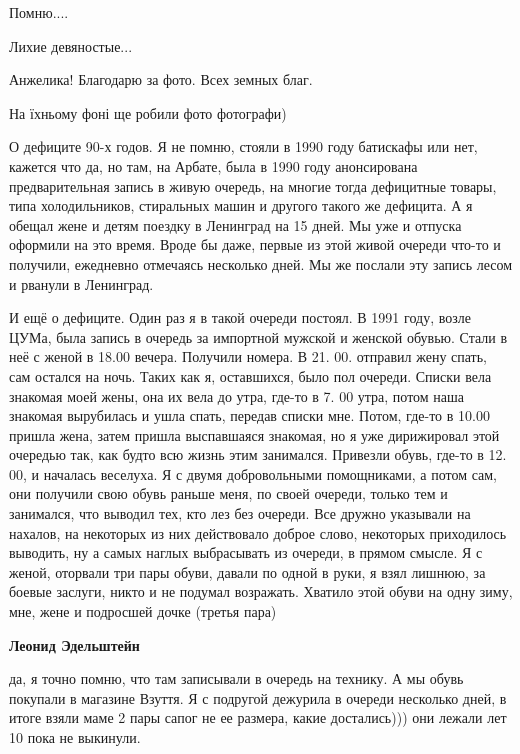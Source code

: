 Помню....


Лихие девяностые...


Анжелика! Благодарю за фото. Всех земных благ.


На їхньому фоні ще робили фото фотографи)


О дефиците 90-х годов. Я не помню, стояли в 1990 году батискафы или нет,
кажется что да, но там, на Арбате, была в 1990 году анонсирована
предварительная запись в живую очередь, на многие тогда дефицитные товары, типа
холодильников, стиральных машин и другого такого же дефицита. А я обещал жене и
детям поездку в Ленинград на 15 дней. Мы уже и отпуска оформили на это время.
Вроде бы даже, первые из этой живой очереди что-то и получили, ежедневно
отмечаясь несколько дней. Мы же послали эту запись лесом и рванули в Ленинград.

И ещё о дефиците. Один раз я в такой очереди постоял. В 1991 году, возле ЦУМа,
была запись в очередь за импортной мужской и женской обувью. Стали в неё с
женой в 18.00 вечера. Получили номера. В 21. 00. отправил жену спать, сам
остался на ночь. Таких как я, оставшихся, было пол очереди. Списки вела
знакомая моей жены, она их вела до утра, где-то в 7. 00 утра, потом наша
знакомая вырубилась и ушла спать, передав списки мне. Потом, где-то в 10.00
пришла жена, затем пришла выспавшаяся знакомая, но я уже дирижировал этой
очередью так, как будто всю жизнь этим занимался. Привезли обувь, где-то в 12.
00, и началась веселуха. Я с двумя добровольными помощниками, а потом сам, они
получили свою обувь раньше меня, по своей очереди, только тем и занимался, что
выводил тех, кто лез без очереди. Все дружно указывали на нахалов, на некоторых
из них действовало доброе слово, некоторых приходилось выводить, ну а самых
наглых выбрасывать из очереди, в прямом смысле. Я с женой, оторвали три пары
обуви, давали по одной в руки, я взял лишнюю, за боевые заслуги, никто и не
подумал возражать. Хватило этой обуви на одну зиму, мне, жене и подросшей дочке
(третья пара)

\begin{itemize} %
\textbf{Леонид Эдельштейн} 

да, я точно помню, что там записывали в очередь на технику. А мы обувь покупали
в магазине Взуття. Я с подругой дежурила в очереди несколько дней, в итоге
взяли маме 2 пары сапог не ее размера, какие достались))) они лежали лет 10
пока не выкинули.

\end{itemize} %

